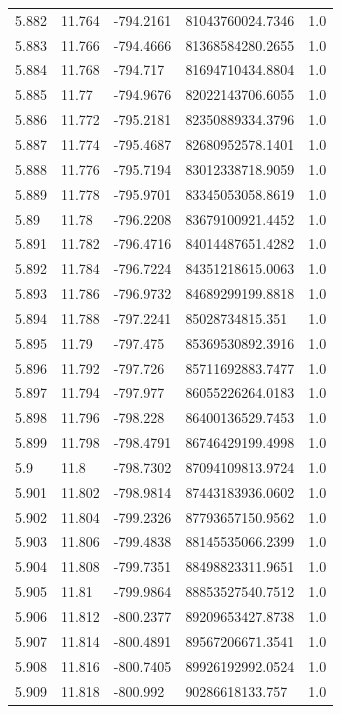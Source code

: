 \begin{tabular}{lllll}
5.882 & 11.764 & -794.2161 & 81043760024.7346 & 1.0 \\
5.883 & 11.766 & -794.4666 & 81368584280.2655 & 1.0 \\
5.884 & 11.768 & -794.717 & 81694710434.8804 & 1.0 \\
5.885 & 11.77 & -794.9676 & 82022143706.6055 & 1.0 \\
5.886 & 11.772 & -795.2181 & 82350889334.3796 & 1.0 \\
5.887 & 11.774 & -795.4687 & 82680952578.1401 & 1.0 \\
5.888 & 11.776 & -795.7194 & 83012338718.9059 & 1.0 \\
5.889 & 11.778 & -795.9701 & 83345053058.8619 & 1.0 \\
5.89 & 11.78 & -796.2208 & 83679100921.4452 & 1.0 \\
5.891 & 11.782 & -796.4716 & 84014487651.4282 & 1.0 \\
5.892 & 11.784 & -796.7224 & 84351218615.0063 & 1.0 \\
5.893 & 11.786 & -796.9732 & 84689299199.8818 & 1.0 \\
5.894 & 11.788 & -797.2241 & 85028734815.351 & 1.0 \\
5.895 & 11.79 & -797.475 & 85369530892.3916 & 1.0 \\
5.896 & 11.792 & -797.726 & 85711692883.7477 & 1.0 \\
5.897 & 11.794 & -797.977 & 86055226264.0183 & 1.0 \\
5.898 & 11.796 & -798.228 & 86400136529.7453 & 1.0 \\
5.899 & 11.798 & -798.4791 & 86746429199.4998 & 1.0 \\
5.9 & 11.8 & -798.7302 & 87094109813.9724 & 1.0 \\
5.901 & 11.802 & -798.9814 & 87443183936.0602 & 1.0 \\
5.902 & 11.804 & -799.2326 & 87793657150.9562 & 1.0 \\
5.903 & 11.806 & -799.4838 & 88145535066.2399 & 1.0 \\
5.904 & 11.808 & -799.7351 & 88498823311.9651 & 1.0 \\
5.905 & 11.81 & -799.9864 & 88853527540.7512 & 1.0 \\
5.906 & 11.812 & -800.2377 & 89209653427.8738 & 1.0 \\
5.907 & 11.814 & -800.4891 & 89567206671.3541 & 1.0 \\
5.908 & 11.816 & -800.7405 & 89926192992.0524 & 1.0 \\
5.909 & 11.818 & -800.992 & 90286618133.757 & 1.0 \\

\end{tabular}
